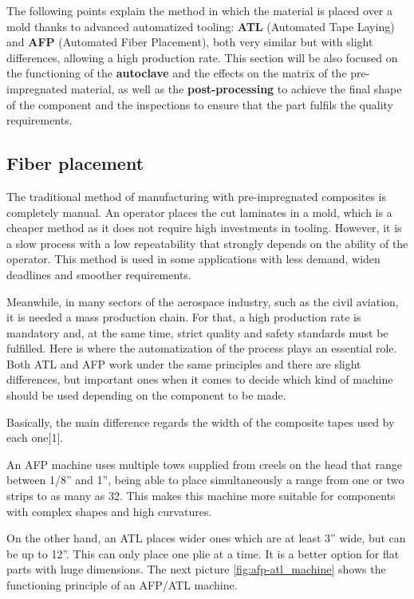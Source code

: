 The following points explain the method in which the material is placed over a mold thanks to advanced automatized tooling: \textbf{ATL} (Automated Tape Laying) and \textbf{AFP} (Automated Fiber Placement), both very similar but with slight differences, allowing a high production rate. This section will be also focused on the functioning of the \textbf{autoclave} and the effects on the matrix of the pre-impregnated material, as well as the \textbf{post-processing} to achieve the final shape of the component and the inspections to ensure that the part fulfils the quality requirements.

\subsection{Fiber placement}

The traditional method of manufacturing with pre-impregnated composites is completely manual. An operator places the cut laminates in a mold, which is a cheaper method as it does not require high investments in tooling. However, it is a slow process with a low repeatability that strongly depends on the ability of the operator. This method is used in some applications with less demand, widen deadlines and smoother requirements.

Meanwhile, in many sectors of the aerospace industry, such as the civil aviation, it is needed a mass production chain. For that, a high production rate is mandatory and, at the same time, strict quality and safety standards must be fulfilled. Here is where the automatization of the process plays an essential role. Both ATL and AFP work under the same principles and there are slight differences, but important ones when it comes to decide which kind of machine should be used depending on the component to be made.

Basically, the main difference regards the width of the composite tapes used by each one[1].

An AFP machine uses multiple tows supplied from creels on the head that range between 1/8” and 1”, being able to place simultaneously a range from one or two strips to as many as 32. This makes this machine more suitable for components with complex shapes and high curvatures.

On the other hand, an ATL places wider ones which are at least 3” wide, but can be up to 12”. This can only place one plie at a time. It is a better option for flat parts with huge dimensions. The next picture \ref{fig:afp-atl_machine} shows the functioning principle of an AFP/ATL machine.

